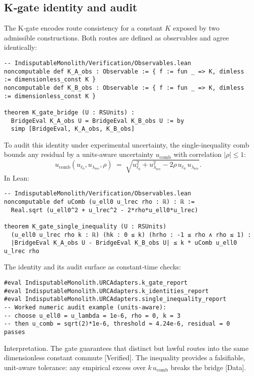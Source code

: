 \documentclass[11pt,a4paper,twoside]{article}
\numberwithin{equation}{section}
\theoremstyle{customthm}
\theoremstyle{customdef}
\theoremstyle{customrem}
\begin{document}
\subsection{K‐gate identity and audit}

The K‐gate encodes route consistency for a constant \(K\) exposed by two admissible constructions. Both routes are defined as observables and agree identically:
\begin{lstlisting}
-- IndisputableMonolith/Verification/Observables.lean
noncomputable def K_A_obs : Observable := { f := fun _ => K, dimless := dimensionless_const K }
noncomputable def K_B_obs : Observable := { f := fun _ => K, dimless := dimensionless_const K }

theorem K_gate_bridge (U : RSUnits) :
  BridgeEval K_A_obs U = BridgeEval K_B_obs U := by
  simp [BridgeEval, K_A_obs, K_B_obs]
\end{lstlisting}

To audit this identity under experimental uncertainty, the single‐inequality comb bounds any residual by a units‐aware uncertainty \(u_{\mathrm{comb}}\) with correlation \(|\rho|\le 1\):
\[
u_{\mathrm{comb}}(u_{\ell_0},u_{\lambda_{\mathrm{rec}}},\rho)
\;=\; \sqrt{u_{\ell_0}^2 + u_{\lambda_{\mathrm{rec}}}^2 - 2\rho\,u_{\ell_0}\,u_{\lambda_{\mathrm{rec}}}}.
\]
In Lean:
\begin{lstlisting}
-- IndisputableMonolith/Verification/Observables.lean
noncomputable def uComb (u_ell0 u_lrec rho : ℝ) : ℝ :=
  Real.sqrt (u_ell0^2 + u_lrec^2 - 2*rho*u_ell0*u_lrec)

theorem K_gate_single_inequality (U : RSUnits)
  (u_ell0 u_lrec rho k : ℝ) (hk : 0 ≤ k) (hrho : -1 ≤ rho ∧ rho ≤ 1) :
  |BridgeEval K_A_obs U - BridgeEval K_B_obs U| ≤ k * uComb u_ell0 u_lrec rho
\end{lstlisting}

The identity and its audit surface as constant‐time checks:
\begin{lstlisting}
#eval IndisputableMonolith.URCAdapters.k_gate_report
#eval IndisputableMonolith.URCAdapters.k_identities_report
#eval IndisputableMonolith.URCAdapters.single_inequality_report
-- Worked numeric audit example (units-aware):
-- choose u_ell0 = u_lambda = 1e-6, rho = 0, k = 3
-- then u_comb = sqrt(2)*1e-6, threshold ≈ 4.24e-6, residual = 0 passes
\end{lstlisting}

Interpretation. The gate guarantees that distinct but lawful routes into the same dimensionless constant commute [Verified]. The inequality provides a falsifiable, unit-aware tolerance: any empirical excess over \(k\,u_{\mathrm{comb}}\) breaks the bridge [Data].
\end{document}
